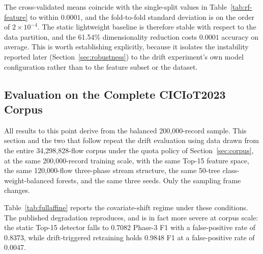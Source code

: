 \documentclass[11pt,a4paper]{article}
\begin{document}
\begin{table}[!ht]
\centering
\caption{Five-fold stratified cross-validation of the static Random
Forest baselines (mean $\pm$ standard deviation across folds).}
\label{tab:cv}
\small
{}
\end{table}

The cross-validated means coincide with the single-split values in
Table~\ref{tab:rf-feature} to within $0.0001$, and the fold-to-fold
standard deviation is on the order of $2 \times 10^{-4}$. The static
lightweight baseline is therefore stable with respect to the data
partition, and the 61.54\% dimensionality reduction costs
$0.0001$ accuracy on average. This is worth establishing explicitly,
because it isolates the instability reported later
(Section~\ref{sec:robustness}) to the drift experiment's own model
configuration rather than to the feature subset or the dataset.

\subsection{Evaluation on the Complete CICIoT2023 Corpus}
\label{sec:fullcorpus}

All results to this point derive from the balanced 200{,}000-record sample. This
section and the two that follow repeat the drift evaluation using data drawn
from the entire 34{,}298{,}828-flow corpus under the quota policy of
Section~\ref{sec:corpus}, at the same 200{,}000-record training scale, with the
same Top-15 feature space, the same 120{,}000-flow three-phase stream structure,
the same 50-tree class-weight-balanced forests, and the same three seeds. Only
the sampling frame changes.

Table~\ref{tab:fullaffine} reports the covariate-shift regime under these
conditions. The published degradation reproduces, and is in fact more severe at
corpus scale: the static Top-15 detector falls to 0.7082 Phase-3 F1 with a
false-positive rate of 0.8373, while drift-triggered retraining holds 0.9848 F1
at a false-positive rate of 0.0047.
\end{document}
